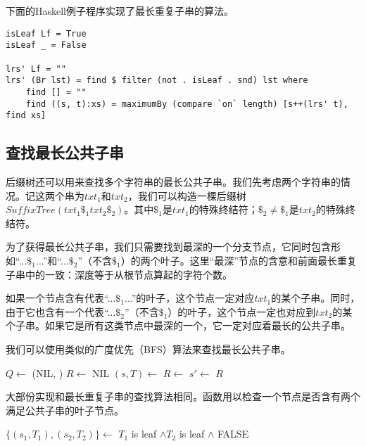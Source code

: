 \documentclass[UTF8]{article}
\begin{document}
下面的Haskell例子程序实现了最长重复子串的算法。

\lstset{language=Haskell}
\begin{lstlisting}[style=Haskell]
isLeaf Lf = True
isLeaf _ = False

lrs' Lf = ""
lrs' (Br lst) = find $ filter (not . isLeaf . snd) lst where
    find [] = ""
    find ((s, t):xs) = maximumBy (compare `on` length) [s++(lrs' t), find xs]
\end{lstlisting} %

\subsection{查找最长公共子串}

后缀树还可以用来查找多个字符串的最长公共子串。我们先考虑两个字符串的情况。记这两个串为$txt_1$和$txt_2$，我们可以构造一棵后缀树$SuffixTree(txt_1\$_1txt_2\$_2)$。其中$\$_1$是$txt_1$的特殊终结符；$\$_2 \neq \$_1$是$txt_2$的特殊终结符。

为了获得最长公共子串，我们只需要找到最深的一个分支节点，它同时包含形如“...$\$_1$...”和“...$\$_2$”（不含$\$_1$）的两个叶子。这里“最深”节点的含意和前面最长重复子串中的一致：深度等于从根节点算起的字符个数。

如果一个节点含有代表“...$\$_1$...”的叶子，这个节点一定对应$txt_1$的某个子串。同时，由于它也含有一个代表“...$\$_2$”（不含$\$_1$）的叶子，这个节点一定也对应到$txt_2$的某个子串。如果它是所有这类节点中最深的一个，它一定对应着最长的公共子串。

我们可以使用类似的广度优先（BFS）算法来查找最长公共子串。

\begin{algorithmic}[1]
  \State $Q \gets$ (NIL, )
  \State $R \gets$ NIL
    \State $(s, T) \gets$ 
      \State $R \gets$ 
    \EndIf
        \State $s' \gets$ 
        \State {}
      \EndIf
    \EndFor
  \EndWhile
  \State \Return $R$
\EndFunction
\end{algorithmic}

大部份实现和最长重复子串的查找算法相同。函数用以检查一个节点是否含有两个满足公共子串的叶子节点。

\begin{algorithmic}[1]
    \State $\{(s_1, T_1), (s_2, T_2)\} \gets$ 
    \State \Return $T_1$ is leaf $\land T_2$ is leaf $\land$ 
  \EndIf
  \State \Return FALSE
\EndFunction
\end{algorithmic}
\end{document}
